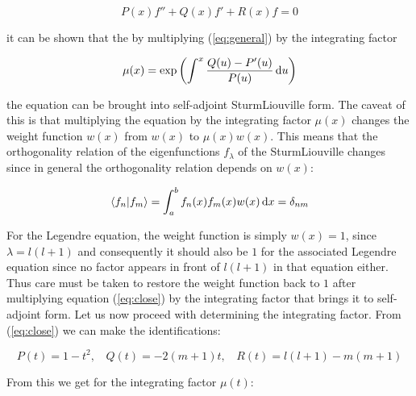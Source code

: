 \documentclass{article}
\begin{document}
    \begin{equation}
        \label{eq:general}
        P(x)f'' + Q(x)f' + R(x)f = 0
    \end{equation}

    it can be shown that the by multiplying (\ref{eq:general}) by the integrating factor

    \begin{equation}
        \mu(x) = \exp\left(\int^{x} \frac{Q(u) - P'(u)}{P(u)} \odif{u}\right)
    \end{equation}

    the equation can be brought into self-adjoint Sturm\textendash Liouville form. The caveat of this is that multiplying the equation by the integrating factor $\mu(x)$ changes
    the weight function $w(x)$ from $w(x)$ to $\mu(x)w(x)$. This means that the orthogonality relation of the eigenfunctions $f_{\lambda}$ of the Sturm\textendash Liouville changes
    since in general the orthogonality relation depends on $w(x)$:

    \begin{equation}
        \langle f_n | f_m \rangle = \int_{a}^{b}f_n(x)f_m(x)w(x)\odif{x} = \delta_{nm}
    \end{equation}

    For the Legendre equation, the weight function is simply $w(x) = 1$, since $\lambda = l(l + 1)$ and consequently it should also be $1$ for the associated Legendre equation since no factor appears in 
    front of $l(l+1)$ in that equation either. Thus care must be taken to restore the weight function back to $1$ after multiplying equation (\ref{eq:close}) by the integrating factor that brings
    it to self-adjoint form. Let us now proceed with determining the integrating factor. From (\ref{eq:close}) we can make the identifications:

    \begin{equation}
        P(t) = 1 - t^2, \ \ \ \ Q(t) = -2(m + 1)t, \ \ \ \ R(t) = l(l + 1) - m(m + 1)
    \end{equation}

    From this we get for the integrating factor $\mu(t)$:
\end{document}
